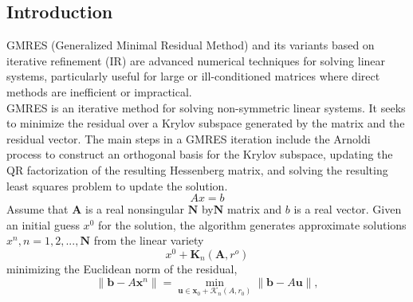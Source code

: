 
\subsection{Introduction}
GMRES (Generalized Minimal Residual Method) and its variants based on iterative refinement (IR) are advanced numerical techniques for solving linear systems, particularly useful for large or ill-conditioned matrices where direct methods are inefficient or impractical. \\
GMRES is an iterative method for solving non-symmetric linear systems. It seeks to minimize the residual over a Krylov subspace generated by the matrix and the residual vector. The main steps in a GMRES iteration include the Arnoldi process to construct an orthogonal basis for the Krylov subspace, updating the QR factorization of the resulting Hessenberg matrix, and solving the resulting least squares problem to update the solution.\\
\begin{equation}
    Ax=b
\end{equation}
Assume that $\textbf{A}$ is a real nonsingular $\textbf{N}$ by$\textbf{N}$ matrix and $b$ is a real vector. Given an initial guess $x^0$ for the solution, the algorithm generates approximate solutions $x^n,n=1,2,...,\textbf{N}$ from the linear variety
\begin{equation}
    x^0+\textbf{K}_n(\textbf{A},r^o)
\end{equation}
minimizing the Euclidean norm of the residual,
\begin{equation}
    \| \mathbf{b} - A\mathbf{x}^n \| = \min_{\mathbf{u} \in \mathbf{x}_0 + \mathcal{K}_n(A,r_0)} \| \mathbf{b} - A\mathbf{u} \|,
\end{equation}


